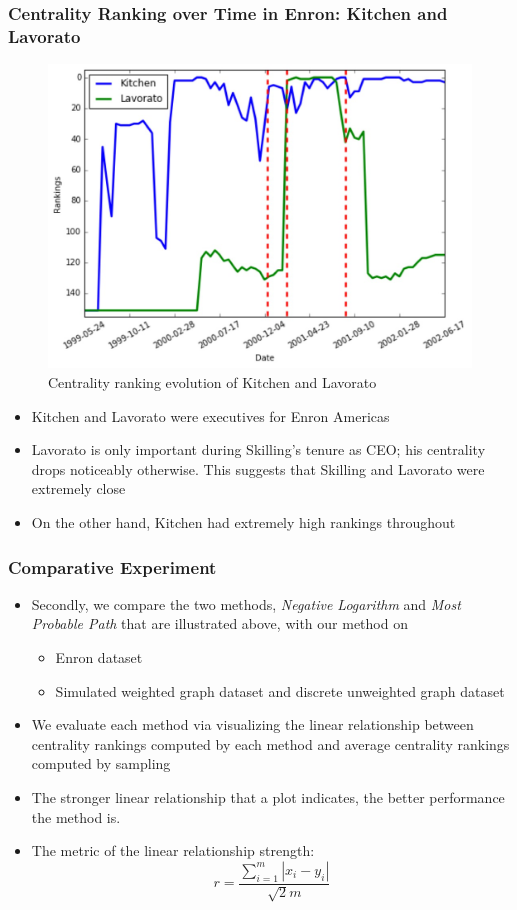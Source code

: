 \documentclass[10pt]{beamer}
\begin{document}
\begin{frame}
\frametitle{Centrality Ranking over Time in Enron: Kitchen and Lavorato}
\begin{figure}[H]
\centering
\includegraphics[scale = 0.3]{rank_change2.png}
\caption{Centrality ranking evolution of Kitchen and Lavorato}
\end{figure}
\vspace{-0.15in}
\begin{itemize}
\item Kitchen and Lavorato were executives for Enron Americas
\item Lavorato is only important during Skilling's tenure as CEO; his centrality drops noticeably otherwise. This suggests that Skilling and Lavorato were extremely close
\item On the other hand, Kitchen had extremely high rankings throughout
\end{itemize}
\end{frame}

\begin{frame}
\frametitle{Comparative Experiment}
\begin{itemize}
\item Secondly, we compare the two methods, \textit{Negative Logarithm} and \textit{Most Probable Path} that are illustrated above, with our method on 
\begin{itemize}
\item Enron dataset
\item Simulated weighted graph dataset and discrete unweighted graph dataset
\end{itemize}
\item We evaluate each method via visualizing the linear relationship between centrality rankings computed by each method and average centrality rankings computed by sampling
\item The stronger linear relationship that a plot indicates, the better performance the method is.
\item The metric of the linear relationship strength:
\[ r=\frac{\sum_{i=1}^{m}|x_i-y_i|}{\sqrt{2}m} \]
\end{itemize}
\end{frame}
\end{document}
